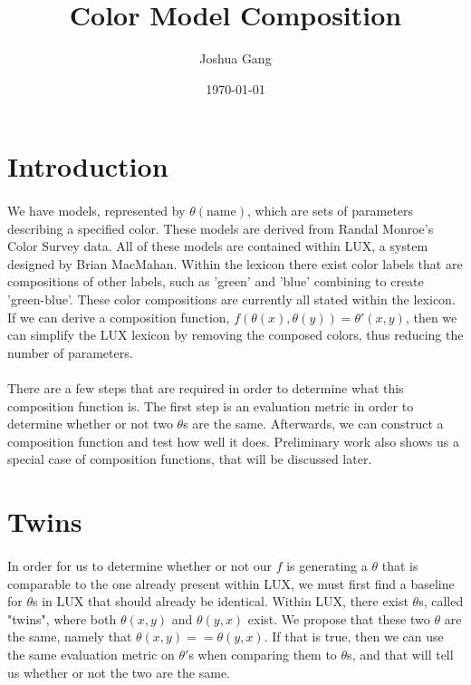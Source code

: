 \documentclass[12pt, letterpaper]{article}
\begin{document}
\title{Color Model Composition}
\author{Joshua Gang}
\date{\today}
\maketitle

\section{Introduction}

\paragraph{} We have models, represented by $\theta(\text{name})$, which are sets of parameters describing a specified color. These models are derived from Randal Monroe's Color Survey data. All of these models are contained within LUX, a system designed by Brian MacMahan. Within the lexicon there exist color labels that are compositions of other labels, such as 'green' and 'blue' combining to create 'green-blue'. These color compositions are currently all stated within the lexicon. If we can derive a composition function, $f(\theta(x), \theta(y)) = \theta'(x,y)$, then we can simplify the LUX lexicon by removing the composed colors, thus reducing the number of parameters. 

\paragraph{} There are a few steps that are required in order to determine what this composition function is. The first step is an evaluation metric in order to determine whether or not two $\theta$s are the same. Afterwards, we can construct a composition function and test how well it does. Preliminary work also shows us a special case of composition functions, that will be discussed later.

\section{Twins}

\paragraph{} In order for us to determine whether or not our $f$ is generating a $\theta$ that is comparable to the one already present within LUX, we must first find a baseline for $\theta$s  in LUX that should already be identical. Within LUX, there exist $\theta$s, called "twins", where both $\theta(x,y)$ and $\theta(y, x)$ exist. We propose that these two $\theta$ are the same, namely that $\theta(x,y) == \theta(y, x)$. If that is true, then we can use the same evaluation metric on $\theta'$s when comparing them to $\theta$s, and that will tell us whether or not the two are the same. 
\end{document}
